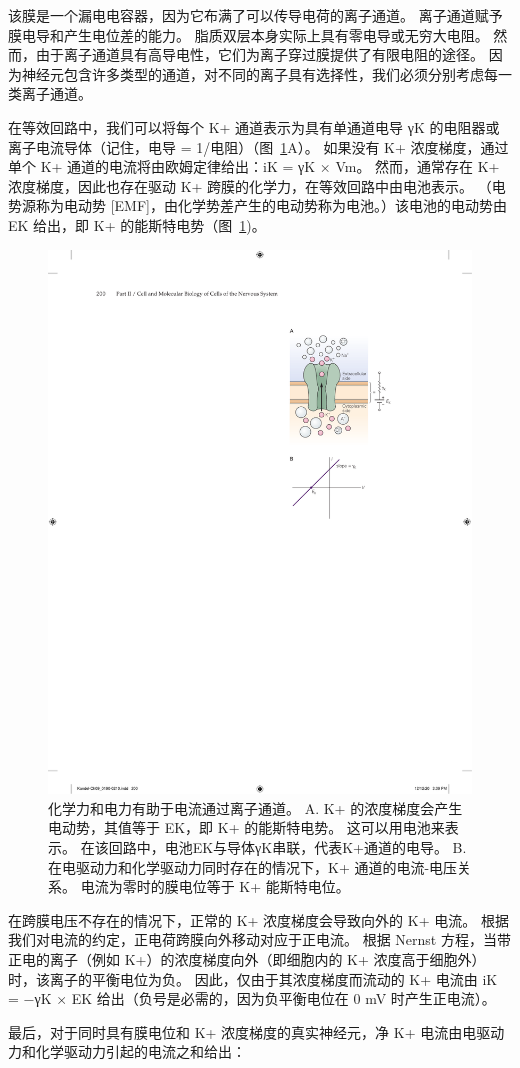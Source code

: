 该膜是一个漏电电容器，因为它布满了可以传导电荷的离子通道。
离子通道赋予膜电导和产生电位差的能力。
脂质双层本身实际上具有零电导或无穷大电阻。
然而，由于离子通道具有高导电性，它们为离子穿过膜提供了有限电阻的途径。
因为神经元包含许多类型的通道，对不同的离子具有选择性，我们必须分别考虑每一类离子通道。


在等效回路中，我们可以将每个 K+ 通道表示为具有单通道电导 γK 的电阻器或离子电流导体（记住，电导 = 1/电阻）（图~\ref{fig:9_6}A）。 
如果没有 K+ 浓度梯度，通过单个 K+ 通道的电流将由欧姆定律给出：iK = γK × Vm。
然而，通常存在 K+ 浓度梯度，因此也存在驱动 K+ 跨膜的化学力，在等效回路中由电池表示。
（电势源称为电动势 [EMF]，由化学势差产生的电动势称为电池。）该电池的电动势由 EK 给出，即 K+ 的能斯特电势（图~\ref{fig:9_6})。


\begin{figure}[htbp]
	\centering
	\includegraphics[width=0.5\linewidth]{chap09/fig_9_6}
	\caption{化学力和电力有助于电流通过离子通道。 A. K+ 的浓度梯度会产生电动势，其值等于 EK，即 K+ 的能斯特电势。 这可以用电池来表示。 在该回路中，电池EK与导体γK串联，代表K+通道的电导。 B. 在电驱动力和化学驱动力同时存在的情况下，K+ 通道的电流-电压关系。 电流为零时的膜电位等于 K+ 能斯特电位。}
	\label{fig:9_6}
\end{figure}


在跨膜电压不存在的情况下，正常的 K+ 浓度梯度会导致向外的 K+ 电流。
根据我们对电流的约定，正电荷跨膜向外移动对应于正电流。
根据 Nernst 方程，当带正电的离子（例如 K+）的浓度梯度向外（即细胞内的 K+ 浓度高于细胞外）时，该离子的平衡电位为负。
因此，仅由于其浓度梯度而流动的 K+ 电流由 iK = −γK × EK 给出（负号是必需的，因为负平衡电位在 0 mV 时产生正电流）。


最后，对于同时具有膜电位和 K+ 浓度梯度的真实神经元，净 K+ 电流由电驱动力和化学驱动力引起的电流之和给出：


